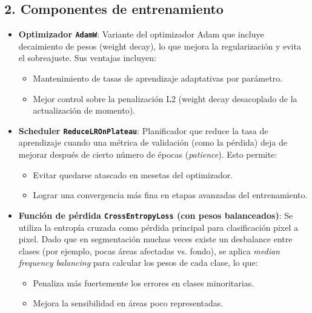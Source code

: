 \subsection*{2. Componentes de entrenamiento}

\begin{itemize}
\item \textbf{Optimizador \texttt{AdamW}}:
Variante del optimizador Adam que incluye decaimiento de pesos (weight decay), lo que mejora la regularización y evita el sobreajuste. Sus ventajas incluyen:
\begin{itemize}
\item Mantenimiento de tasas de aprendizaje adaptativas por parámetro.
\item Mejor control sobre la penalización L2 (weight decay desacoplado de la actualización de momento).
\end{itemize}

\item \textbf{Scheduler \texttt{ReduceLROnPlateau}}:
Planificador que reduce la tasa de aprendizaje cuando una métrica de validación (como la pérdida) deja de mejorar después de cierto número de épocas (\textit{patience}). Esto permite:
\begin{itemize}
\item Evitar quedarse atascado en mesetas del optimizador.
\item Lograr una convergencia más fina en etapas avanzadas del entrenamiento.
\end{itemize}

\item \textbf{Función de pérdida \texttt{CrossEntropyLoss} (con pesos balanceados)}:
Se utiliza la entropía cruzada como pérdida principal para clasificación pixel a pixel. Dado que en segmentación muchas veces existe un desbalance entre clases (por ejemplo, pocas áreas afectadas vs. fondo), se aplica \textit{median frequency balancing} para calcular los pesos de cada clase, lo que:
\begin{itemize}
\item Penaliza más fuertemente los errores en clases minoritarias.
\item Mejora la sensibilidad en áreas poco representadas.
\end{itemize}
\end{itemize}

